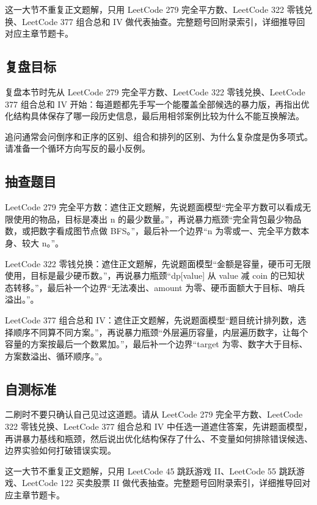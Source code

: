 这一大节不重复正文题解，只用 LeetCode 279 完全平方数、LeetCode 322 零钱兑换、LeetCode 377 组合总和 IV 做代表抽查。完整题号回附录索引，详细推导回对应主章节题卡。

\subsection{复盘目标}

复盘本节时先从 LeetCode 279 完全平方数、LeetCode 322 零钱兑换、LeetCode 377 组合总和 IV 开始：每道题都先手写一个能覆盖全部候选的暴力版，再指出优化结构具体保存了哪一段历史信息，最后用相邻案例比较为什么不能互换解法。

追问通常会问倒序和正序的区别、组合和排列的区别、为什么复杂度是伪多项式。请准备一个循环方向写反的最小反例。

\subsection{抽查题目}

LeetCode 279 完全平方数：遮住正文题解，先说题面模型“完全平方数可以看成无限使用的物品，目标是凑出 n 的最少数量。”，再说暴力瓶颈“完全背包最少物品数，或把数字看成图节点做 BFS。”，最后补一个边界“n 为零或一、完全平方数本身、较大 n。”。

LeetCode 322 零钱兑换：遮住正文题解，先说题面模型“金额是容量，硬币可无限使用，目标是最少硬币数。”，再说暴力瓶颈“dp[value] 从 value 减 coin 的已知状态转移。”，最后补一个边界“无法凑出、amount 为零、硬币面额大于目标、哨兵溢出。”。

LeetCode 377 组合总和 IV：遮住正文题解，先说题面模型“题目统计排列数，选择顺序不同算不同方案。”，再说暴力瓶颈“外层遍历容量，内层遍历数字，让每个容量的方案按最后一个数累加。”，最后补一个边界“target 为零、数字大于目标、方案数溢出、循环顺序。”。

\subsection{自测标准}

二刷时不要只确认自己见过这道题。请从 LeetCode 279 完全平方数、LeetCode 322 零钱兑换、LeetCode 377 组合总和 IV 中任选一道遮住答案，先讲题面模型，再讲暴力基线和瓶颈，然后说出优化结构保存了什么、不变量如何排除错误候选、边界实验如何打破错误实现。

这一大节不重复正文题解，只用 LeetCode 45 跳跃游戏 II、LeetCode 55 跳跃游戏、LeetCode 122 买卖股票 II 做代表抽查。完整题号回附录索引，详细推导回对应主章节题卡。


